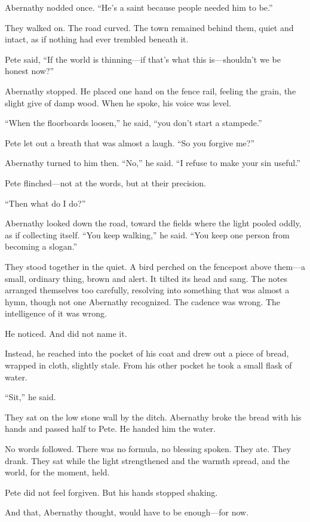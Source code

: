Abernathy nodded once. ``He's a saint because people needed him to be.''

They walked on. The road curved. The town remained behind them, quiet and intact, as if nothing had ever trembled beneath it.

Pete said, ``If the world is thinning---if that's what this is---shouldn't we be honest now?''

Abernathy stopped. He placed one hand on the fence rail, feeling the grain, the slight give of damp wood. When he spoke, his voice was level.

``When the floorboards loosen,'' he said, ``you don't start a stampede.''

Pete let out a breath that was almost a laugh. ``So you forgive me?''

Abernathy turned to him then. ``No,'' he said. ``I refuse to make your sin useful.''

Pete flinched—not at the words, but at their precision.

``Then what do I do?''

Abernathy looked down the road, toward the fields where the light pooled oddly, as if collecting itself. ``You keep walking,'' he said. ``You keep one person from becoming a slogan.''

They stood together in the quiet. A bird perched on the fencepost above them—a small, ordinary thing, brown and alert. It tilted its head and sang. The notes arranged themselves too carefully, resolving into something that was almost a hymn, though not one Abernathy recognized. The cadence was wrong. The intelligence of it was wrong.

He noticed.
And did not name it.

Instead, he reached into the pocket of his coat and drew out a piece of bread, wrapped in cloth, slightly stale. From his other pocket he took a small flask of water.

``Sit,'' he said.

They sat on the low stone wall by the ditch. Abernathy broke the bread with his hands and passed half to Pete. He handed him the water.

No words followed. There was no formula, no blessing spoken. They ate. They drank. They sat while the light strengthened and the warmth spread, and the world, for the moment, held.

Pete did not feel forgiven.
But his hands stopped shaking.

And that, Abernathy thought, would have to be enough—for now.
